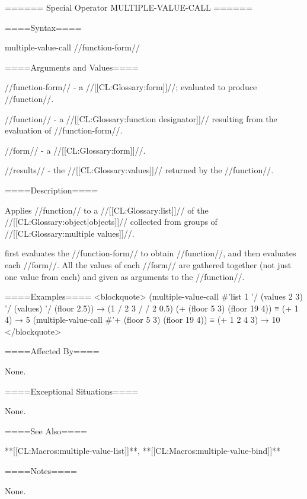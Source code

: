 ====== Special Operator MULTIPLE-VALUE-CALL ======

====Syntax====

\DefspecWithValues multiple-value-call {//function-form// } {}

====Arguments and Values====

//function-form// - a //[[CL:Glossary:form]]//; evaluated to produce //function//.

//function// - a //[[CL:Glossary:function designator]]// resulting from the evaluation of //function-form//.

//form// - a //[[CL:Glossary:form]]//.

//results// - the //[[CL:Glossary:values]]// returned by the //function//.

====Description====

Applies //function// to a //[[CL:Glossary:list]]// of the //[[CL:Glossary:object|objects]]// collected from groups of //[[CL:Glossary:multiple values]]//.

 first evaluates the //function-form// to obtain //function//, and then evaluates each //form//. All the values of each //form// are gathered together (not just one value from each) and given as arguments to the //function//.

====Examples==== <blockquote> (multiple-value-call #'list 1 '/ (values 2 3) '/ (values) '/ (floor 2.5)) → (1 / 2 3 / / 2 0.5) (+ (floor 5 3) (floor 19 4)) ≡ (+ 1 4) → 5 (multiple-value-call #'+ (floor 5 3) (floor 19 4)) ≡ (+ 1 2 4 3) → 10 </blockquote>

====Affected By====

None.

====Exceptional Situations====

None.

====See Also====

**[[CL:Macros:multiple-value-list]]**, **[[CL:Macros:multiple-value-bind]]**

====Notes====

None.

